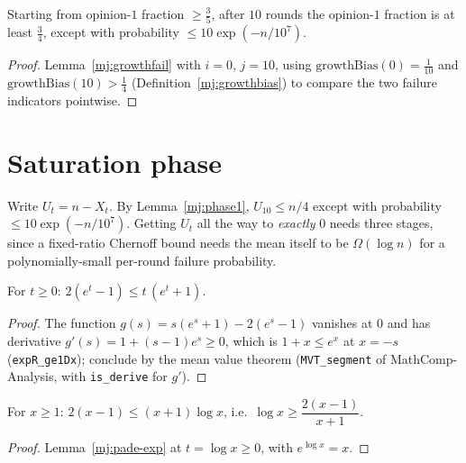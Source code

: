 \begin{lemma}[Phase 1]\label{mj:phase1}
  \rocqok
  Starting from opinion-$1$ fraction $\ge\tfrac35$, after $10$ rounds the
  opinion-$1$ fraction is at least $\tfrac34$, except with probability
  $\le10\exp(-n/10^7)$.
\end{lemma}
\begin{proof}
  \rocqok
  Lemma~\ref{mj:growthfail} with $i = 0$, $j = 10$, using
  $\mathrm{growthBias}(0) = \tfrac1{10}$ and
  $\mathrm{growthBias}(10) > \tfrac14$ (Definition~\ref{mj:growthbias}) to
  compare the two failure indicators pointwise.
\end{proof}

\section{Saturation phase}\label{mj:sec:saturation}

Write $U_t = n-X_t$. By Lemma~\ref{mj:phase1}, $U_{10}\le n/4$ except with
probability $\le10\exp(-n/10^7)$. Getting $U_t$ all the way to
\emph{exactly} $0$ needs three stages, since a fixed-ratio Chernoff bound
needs the mean itself to be $\Omega(\log n)$ for a polynomially-small
per-round failure probability.

\begin{lemma}\label{mj:pade-exp}
  \rocqok
  For $t \ge 0$: $2(e^t - 1) \le t\,(e^t + 1)$.
\end{lemma}
\begin{proof}
  \rocqok
  The function $g(s) = s(e^s+1) - 2(e^s-1)$ vanishes at $0$ and has
  derivative $g'(s) = 1 + (s-1)e^s \ge 0$, which is $1 + x \le e^x$ at
  $x = -s$ (\texttt{expR\_ge1Dx}); conclude by the mean value theorem
  (\texttt{MVT\_segment} of MathComp-Analysis, with \texttt{is\_derive}
  for $g'$).
\end{proof}

\begin{lemma}\label{mj:pade-ln}
  \rocqok
  For $x \ge 1$: $2(x - 1) \le (x + 1)\log x$, i.e.\
  $\log x \ge \dfrac{2(x-1)}{x+1}$.
\end{lemma}
\begin{proof}
  \rocqok
  Lemma~\ref{mj:pade-exp} at $t = \log x \ge 0$, with $e^{\log x} = x$.
\end{proof}

